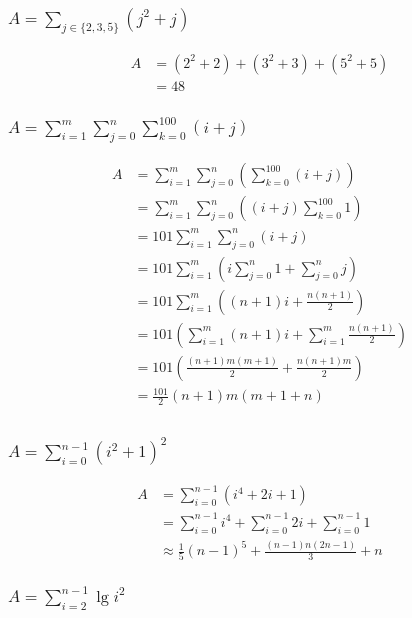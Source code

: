 \documentclass{article}
\begin{document}
\subsubsection{$A=\sum_{j \in \{2, 3, 5\}} (j^2 + j)$}

\[
\begin{aligned}
A &= (2^2+2)+(3^2+3)+(5^2+5) \\
&= 48
\end{aligned}
\]

\subsubsection{$A=\sum_{i=1}^{m}\sum_{j=0}^{n}\sum_{k=0}^{100}(i+j)$}

\[
\begin{aligned}
A &= \sum_{i=1}^{m}\sum_{j=0}^{n}(\sum_{k=0}^{100}(i+j)) \\
&= \sum_{i=1}^{m}\sum_{j=0}^{n}((i+j)\sum_{k=0}^{100}1) \\
&= 101\sum_{i=1}^{m}\sum_{j=0}^{n}(i+j) \\
&= 101\sum_{i=1}^{m}(i\sum_{j=0}^{n}1+\sum_{j=0}^{n}j) \\
&= 101\sum_{i=1}^{m}((n+1)i+\frac{n(n+1)}{2}) \\
&= 101(\sum_{i=1}^{m}(n+1)i+\sum_{i=1}^{m}\frac{n(n+1)}{2}) \\
&= 101(\frac{(n+1)m(m+1)}{2}+\frac{n(n+1)m}{2}) \\
&= \frac{101}{2}(n+1)m(m+1+n)
\end{aligned}
\]

\subsection{}

\subsubsection{$A=\sum_{i=0}^{n-1}{(i^2+1)}^2$}

\[
\begin{aligned}
A &= \sum_{i=0}^{n-1}(i^4+2i+1) \\
&= \sum_{i=0}^{n-1}i^4+\sum_{i=0}^{n-1}2i+\sum_{i=0}^{n-1}1 \\
&\approx \frac{1}{5}{(n-1)}^5+\frac{(n-1)n(2n-1)}{3}+n
\end{aligned}
\]

\subsubsection{$A=\sum_{i=2}^{n-1}\lg i^2$}
\end{document}
